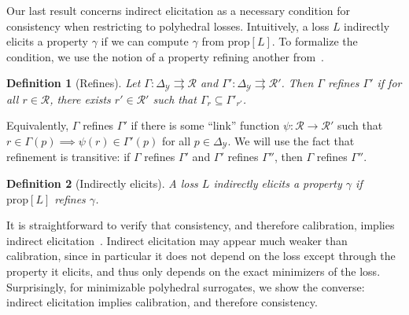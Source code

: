 \documentclass[11pt]{article}
\newcommand{\prop}[1]{\mathrm{prop}[#1]}
\newcommand{\simplex}{\Delta_\Y}
\newcommand{\R}{\mathcal{R}}
\newcommand{\Y}{\mathcal{Y}}
\newcommand{\toto}{\rightrightarrows}
\newtheorem{definition}{Definition}
\begin{document}
Our last result concerns indirect elicitation as a necessary condition for consistency when restricting to polyhedral losses.
Intuitively, a loss $L$ indirectly elicits a property $\gamma$ if we can compute $\gamma$ from $\prop L$.
To formalize the condition, we use the notion of a property refining another from~\citet{frongillo2014general}.

\begin{definition}[Refines]
	Let $\Gamma:\simplex \toto \R$ and $\Gamma':\simplex\toto \R'$.
	Then $\Gamma$ \emph{refines} $\Gamma'$ if for all $r \in \R$, there exists $r' \in \R'$ such that $\Gamma_{r} \subseteq \Gamma'_{r'}$.
\end{definition}
Equivalently, $\Gamma$ refines $\Gamma'$ if there is some ``link'' function $\psi:\R\to\R'$ such that $r\in\Gamma(p) \implies \psi(r) \in \Gamma'(p)$ for all $p\in\simplex$.
We will use the fact that refinement is transitive: if $\Gamma$ refines $\Gamma'$ and $\Gamma'$ refines $\Gamma''$, then $\Gamma$ refines $\Gamma''$.

\begin{definition}[Indirectly elicits]
  A loss $L$ \emph{indirectly elicits} a property $\gamma$ if $\prop L$ refines $\gamma$.
\end{definition}

It is straightforward to verify that consistency, and therefore calibration, implies indirect elicitation~\citep{finocchiaro2021unifying,agarwal2015consistent,steinwart2008support}.
Indirect elicitation may appear much weaker than calibration, since in particular it does not depend on the loss except through the property it elicits, and thus only depends on the exact minimizers of the loss.
Surprisingly, for minimizable polyhedral surrogates, we show the converse: indirect elicitation implies calibration, and therefore consistency.
\end{document}
